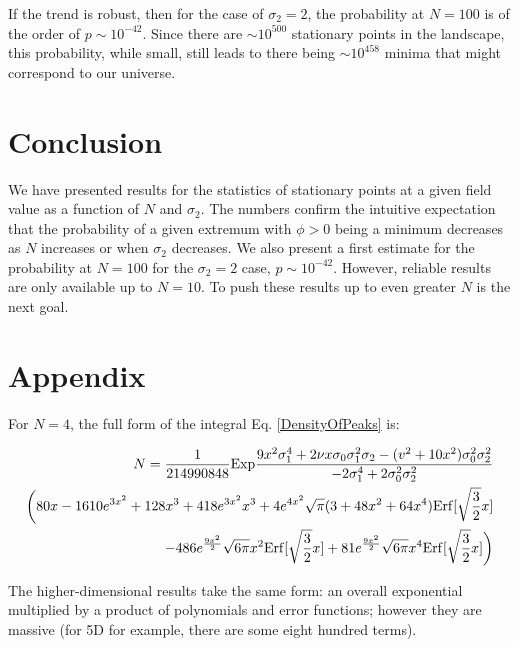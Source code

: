\documentclass[12pt]{article}
\begin{document}
If the trend is robust, then for the case of $\sigma_2=2$, the probability at $N=100$ is of the order of $p \sim 10^{-42}$. Since there are $\sim 10^{500}$ stationary points in the landscape,\cite{Douglas} this probability, while small, still leads to there being $\sim 10^{458}$ minima that might correspond to our universe.

\section{Conclusion}
We have presented results for the statistics of stationary points at a given field value as a function of $N$ and $\sigma_2$. The numbers confirm the intuitive expectation that the probability of a given extremum with $\phi > 0$ being a minimum decreases as $N$ increases or when $\sigma_2$ decreases. We also present a first estimate for the probability at $N=100$ for the $\sigma_2=2$ case, $p \sim 10^{-42}$. However, reliable results are only available up to $N=10$. To push these results up to even greater $N$ is the next goal.

\section{Appendix}
For $N=4$, the full form of the integral Eq. \ref{DensityOfPeaks} is:

\begin{equation}
\begin{split}
N = \frac{1}{214990848} \mathrm{Exp}\frac{9x^2\sigma_1^4 + 2\nu x \sigma_0 \sigma_1^2 \sigma_2 - (v^2+10x^2)\sigma_0^2\sigma_2^2}{-2\sigma_1^4+2\sigma_0^2\sigma_2^2}\\\bigg{(}80x - 1610e^{3x^2}+128x^3+418e^{3x^2}x^3+4e^{4x^2}\sqrt{\pi}(3+48x^2+64x^4)\mathrm{Erf}[\sqrt{\frac{3}{2}}x]\\
-486e^{\frac{9x^2}{2}}\sqrt{6\pi}x^2\mathrm{Erf}[\sqrt{\frac{3}{2}}x]+81e^{\frac{9x^2}{2}}\sqrt{6\pi}x^4\mathrm{Erf}[\sqrt{\frac{3}{2}}x]\bigg{)}
\end{split}
\end{equation}

The higher-dimensional results take the same form: an overall exponential multiplied by a product of polynomials and error functions; however they are massive (for 5D for example, there are some eight hundred terms).
\end{document}
